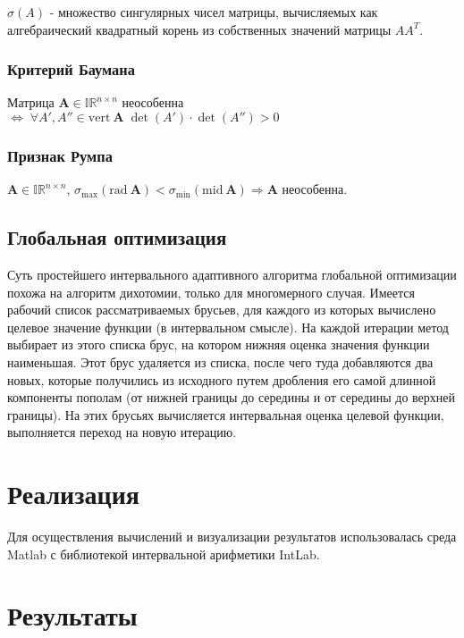 \documentclass[a4paper]{article}
\begin{document}
$\sigma(A)$ - множество сингулярных чисел матрицы, вычисляемых как алгебраический квадратный корень из собственных значений матрицы $AA^T$.
\subsubsection{Критерий Баумана}
Матрица $\mathbf{A}\in\mathbb{IR}^{n\times n}$ неособенна $\Leftrightarrow\;\forall A',A''\in\mathrm{vert}\:\mathbf{A}\;\det(A')\cdot\det(A'')>0$ 
\subsubsection{Признак Румпа}
$\mathbf{A}\in\mathbb{IR}^{n\times n}$, $\sigma_{\mathrm{max}}(\mathrm{rad}\:\mathbf{A})<\sigma_{\mathrm{min}}(\mathrm{mid}\:\mathbf{A})\Rightarrow\mathbf{A}$ неособенна.
\subsection{Глобальная оптимизация}
Суть простейшего интервального адаптивного алгоритма глобальной оптимизации похожа на алгоритм дихотомии, только для многомерного случая. Имеется рабочий список рассматриваемых брусьев, для каждого из которых вычислено целевое значение функции (в интервальном смысле). На каждой итерации метод выбирает из этого списка брус, на котором нижняя оценка значения функции наименьшая. Этот брус удаляется из списка, после чего туда добавляются два новых, которые получились из исходного путем дробления его самой длинной компоненты пополам (от нижней границы до середины и от середины до верхней границы). На этих брусьях вычисляется интервальная оценка целевой функции, выполняется переход на новую итерацию.
\section{Реализация}
Для осуществления вычислений и визуализации результатов использовалась среда Matlab с библиотекой интервальной арифметики IntLab.
\section{Результаты}
\end{document}
